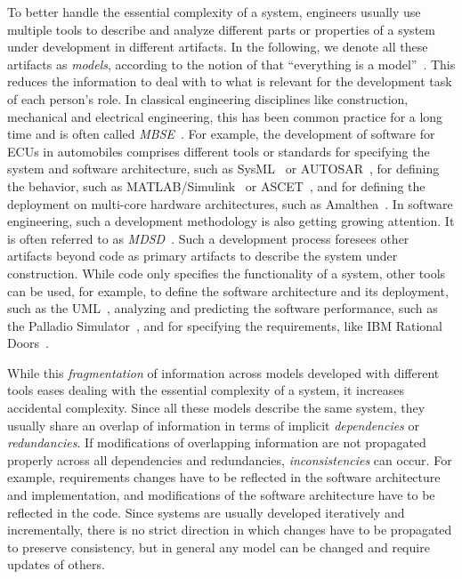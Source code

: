 To better handle the essential complexity of a system, engineers usually use multiple tools to describe and analyze different parts or properties of a system under development in different artifacts.
In the following, we denote all these artifacts as \emph{models}, according to the notion of \citeauthor{bezivin2005sosym} that \enquote{everything is a model}~\cite{bezivin2005sosym}.
This reduces the information to deal with to what is relevant for the development task of each person's role.
In classical engineering disciplines like construction, mechanical and electrical engineering, this has been common practice for a long time and is often called \emph{\gls{MBSE}}~\cite{estefan2007MbseSurvey}.
For example, the development of software for \glspl{ECU} in automobiles comprises different tools or standards for specifying the system and software architecture, such as SysML~\cite{sysml} or AUTOSAR~\cite{scheid2015autosar}, for defining the behavior, such as MATLAB/Simulink~\cite{simulink} or ASCET~\cite{ascet}, and for defining the deployment on multi-core hardware architectures, such as Amalthea~\cite{amalthea, wolff2014a}.
In software engineering, such a development methodology is also getting growing attention.
It is often referred to as \emph{\gls{MDSD}}~\cite{stahl2006a}.
Such a development process foresees other artifacts beyond code as primary artifacts to describe the system under construction.
While code only specifies the functionality of a system, other tools can be used, for example, to define the software architecture and its deployment, such as the \gls{UML}~\cite{uml}, analyzing and predicting the software performance, such as the Palladio Simulator~\cite{reussner2016a}, and for specifying the requirements, like IBM Rational Doors~\cite{laplante2012RequirementsEngineering-Book}.

While this \emph{fragmentation} of information across models developed with different tools eases dealing with the essential complexity of a system, it increases accidental complexity.
Since all these models describe the same system, they usually share an overlap of information in terms of implicit \emph{dependencies} or \emph{redundancies}.
If modifications of overlapping information are not propagated properly across all dependencies and redundancies, \emph{inconsistencies} can occur.
For example, requirements changes have to be reflected in the software architecture and implementation, and modifications of the software architecture have to be reflected in the code.
Since systems are usually developed iteratively and incrementally, there is no strict direction in which changes have to be propagated to preserve consistency, but in general any model can be changed and require updates of others.

